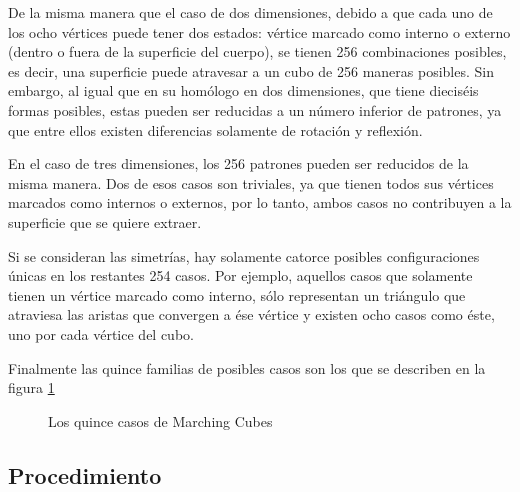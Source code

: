 De la misma manera que el caso de dos dimensiones, debido a que cada uno de los ocho
vértices puede tener dos estados: vértice marcado como interno o externo (dentro o fuera de la
superficie del cuerpo), se tienen 256 combinaciones posibles, es decir, una superficie puede
atravesar a un cubo de 256 maneras posibles. Sin embargo, al igual que en su homólogo en dos
dimensiones, que tiene dieciséis formas posibles, estas pueden ser reducidas a un número inferior
de patrones, ya que entre ellos existen diferencias solamente de rotación y reflexión.

En el caso de tres dimensiones, los 256 patrones pueden ser reducidos de la misma
manera. Dos de esos casos son triviales, ya que tienen todos sus vértices marcados como internos
o externos, por lo tanto, ambos casos no contribuyen a la superficie que se quiere extraer.

Si se consideran las simetrías, hay solamente catorce posibles configuraciones únicas en
los restantes 254 casos. Por ejemplo, aquellos casos que solamente tienen un vértice marcado
como interno, sólo representan un triángulo que atraviesa las aristas que convergen a ése vértice y
existen ocho casos como éste, uno por cada vértice del cubo.

Finalmente las quince familias de posibles casos son los que se describen en la figura \ref{f:estadoDelArte:Shu95adaptivemarching_1}

\begin{figure}[hbp]
\centering
\caption{Los quince casos de Marching Cubes \cite{Shu95adaptivemarching}}
\label{f:estadoDelArte:Shu95adaptivemarching_1}
\end{figure}

\subsection{Procedimiento}
\label{subsec:marchingCubes:procedimiento}

